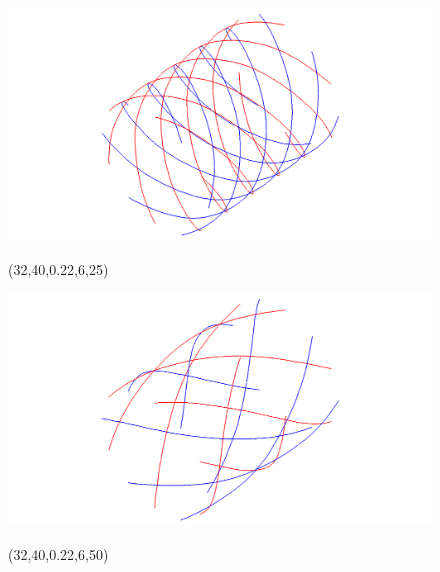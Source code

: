 \begin{figure} [ht]
\begin{latexonly}
	\begin{minipage} [c] [] [c]{5.5cm} 
	\includegraphics [width =\textwidth] {images/WireStentD32L40d22n6b25}
	\begin{center}
	\vspace{-3ex}
	(32,40,0.22,6,25)
	\vspace{1ex}
	\end{center}
\end{minipage}
\hspace{0.3cm}
\begin{minipage} [c] [] [c] {5.5cm}
	\includegraphics [width =\textwidth] {images/WireStentD32L40d22n6b50}
	\begin{center}
	\vspace{-3ex}
	(32,40,0.22,6,50)
	\vspace{1ex}
	\end{center}
\end{minipage}
\hspace{0.3cm}
\hspace{0.1cm}
	\begin{minipage} [c] [] [c]{5.5cm} 

\end{minipage}
\end{latexonly}
\end{figure}
